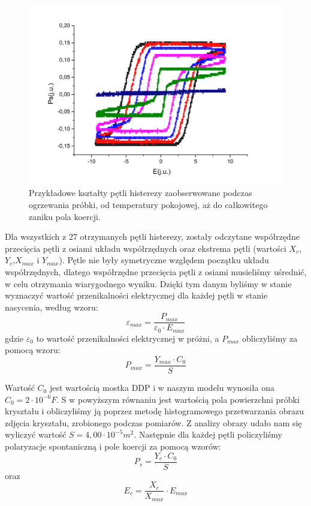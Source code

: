 \documentclass{article}
\begin{document}
\begin{figure}[!h]
	\centering
	\includegraphics[width=0.8\linewidth]{Graph31.png}
	\caption{Przykładowe kształty pętli histerezy zaobserwowane podczas ogrzewania próbki, od temperatury pokojowej, aż do całkowitego zaniku pola koercji.}
	\label{fig:Graph31}
\end{figure}

Dla wszystkich z 27 otrzymanych pętli histerezy, zostały odczytane współrzędne przecięcia pętli z osiami układu współrzędnych oraz ekstrema pętli (wartości $X_{c}$,$Y_{c}$,$X_{max}$ i $Y_{max}$). Pętle nie były symetryczne względem początku układu współrzędnych, dlatego współrzędne przecięcia pętli z osiami musieliśmy uśrednić, w celu otrzymania wiarygodnego wyniku. Dzięki tym danym byliśmy w stanie wyznaczyć wartość przenikalności elektrycznej dla każdej pętli w stanie nasycenia, według wzoru:
\begin{equation}
\varepsilon_{max}=\dfrac{P_{max}}{\varepsilon_{0}\cdot E_{max}}
\end{equation}
gdzie $\varepsilon_{0}$ to wartość przenikalności elektrycznej w próżni, a $P_{max}$ obliczyliśmy za pomocą wzoru:
\begin{equation}
P_{max}=\dfrac{Y_{max}\cdot C_{0}}{S}
\end{equation}

Wartość $C_{0}$ jest wartością mostka DDP i w naszym modelu wynosiła ona $C_{0}=2\cdot10^{-6} F$. S w powyższym równaniu jest wartością pola powierzchni próbki kryształu i obliczyliśmy ją poprzez metodę histogramowego przetwarzania obrazu zdjęcia kryształu, zrobionego podczas pomiarów. Z analizy obrazy udało nam się wyliczyć wartość $S=4,00\cdot10^{-5} m^{2}$. Następnie dla każdej pętli policzyliśmy polaryzacje spontaniczną i pole koercji za pomocą wzorów:
\begin{equation}
P_{s}=\dfrac{Y_{c}\cdot C_{0}}{S}
\end{equation}
oraz 
\begin{equation}
E_{c}=\dfrac{X_{c}}{X_{max}}\cdot E_{max}
\end{equation}
\end{document}
